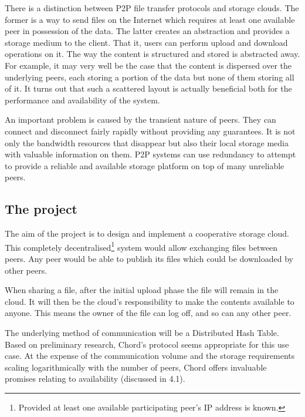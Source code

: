 \documentclass[12pt]{article}
\begin{document}
There is a distinction between P2P file transfer protocols and storage clouds. The former is a way to send files on the Internet which requires at least one available peer in possession of the data. The latter creates an abstraction and provides a storage medium to the client. That it, users can perform upload and download operations on it. The way the content is structured and stored is abstracted away. For example, it may very well be the case that the content is dispersed over the underlying peers, each storing a portion of the data but none of them storing all of it. It turns out that such a scattered layout is actually beneficial both for the performance and availability of the system.

An important problem is caused by the transient nature of peers. They can connect and disconnect fairly rapidly without providing any guarantees. It is not only the bandwidth resources that disappear but also their local storage media with valuable information on them. P2P systems can use redundancy to attempt to provide a reliable and available storage platform on top of many unreliable peers.

\subsection{The project}
The aim of the project is to design and implement a cooperative storage cloud. This completely decentralised\footnote{Provided at least one available participating peer's IP address is known.} system would allow exchanging files between peers. Any peer would be able to publish its files which could be downloaded by other peers.


When sharing a file, after the initial upload phase the file will remain in the cloud. It will then be the cloud's responsibility to make the contents available to anyone. This means the owner of the file can log off, and so can any other peer. 



The underlying method of communication will be a Distributed Hash Table. Based on preliminary research, Chord's protocol seems appropriate for this use case. At the expense of the communication volume and the storage requirements scaling logarithmically with the number of peers, Chord offers invaluable promises relating to availability (discussed in 4.1).
\end{document}
